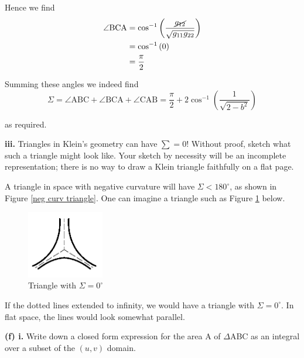 \documentclass[a4paper]{article} %
\begin{document}
Hence we find
\begin{align}
\angle\text{BCA}&=\cos^{-1}\left(\frac{\cancel{g_{12}}}{\sqrt{g_{11}g_{22}}}\right)\\
&=\cos^{-1}\left(0\right)\\
&=\frac{\pi}{2}
\end{align}

Summing these angles we indeed find
\begin{equation}
\Sigma = \angle\text{ABC}+\angle\text{BCA}+\angle\text{CAB}=\frac{\pi}{2}+2\cos^{-1}\left(\frac{1}{\sqrt{2-b^2}}\right)
\end{equation}

as required.


\begin{framed}
\textbf{iii.} Triangles in Klein's geometry can have $\sum=0$! Without proof, sketch what such a triangle might look like. Your sketch by necessity will be an incomplete representation; there is no way to draw a Klein triangle faithfully on a flat page.
\end{framed}

A triangle in space with negative curvature will have $\Sigma<180^{\circ}$, as shown in Figure \ref{neg curv triangle}. One can imagine a triangle such as Figure \ref{no angle triangle} below.

\begin{figure}[h]
\centering
\includegraphics[width=0.3\textwidth]{images/zeroAngle.png}
\caption{Triangle with $\Sigma=0^{\circ}$}
\label{no angle triangle}
\end{figure}

If the dotted lines extended to infinity, we would have a triangle with $\Sigma=0^{\circ}$. In flat space, the lines would look somewhat parallel.


\begin{framed}
\textbf{(f) i.} Write down a closed form expression for the area A of $\Delta$ABC as an integral over a subset of the $(u,v)$ domain.
\end{framed}
\end{document}
